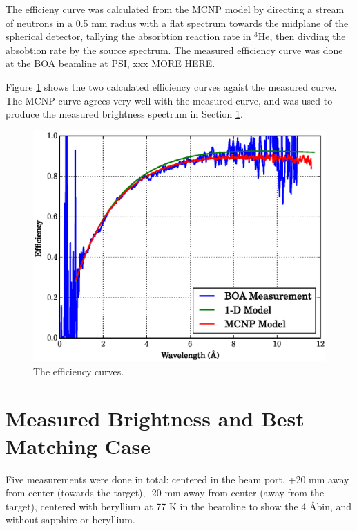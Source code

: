 \documentclass[preprint,12pt]{elsarticle}
\begin{document}
The efficieny curve was calculated from the MCNP model by directing a stream of neutrons in a 0.5 mm radius with a flat spectrum towards the midplane of the spherical detector, tallying the absorbtion reaction rate in $^{3}$He, then divding the absobtion rate by the source spectrum.  The measured efficiency curve was done at the BOA beamline at PSI, xxx MORE HERE.

Figure \ref{fig:eff} shows the two calculated efficiency curves agaist the measured curve.  The MCNP curve agrees very well with the measured curve, and was used to produce the measured brightness spectrum in Section \ref{sec:results}.

\begin{figure}[h!] 
  \centering
    \includegraphics[width=\columnwidth]{graphics/eff.eps}
     \caption{The efficiency curves. \label{fig:eff} }
\end{figure}



\section{Measured Brightness and Best Matching Case}
\label{sec:results}

Five measurements were done in total: centered in the beam port, +20 mm away from center (towards the target), -20 mm away from center (away from the target), centered with beryllium at 77 K in the beamline to show the 4 \AA bin, and without sapphire or beryllium.
\end{document}
